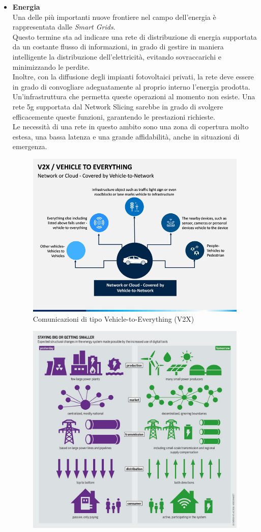 \begin{itemize}
	\item \textbf{Energia}\\
	Una delle più importanti nuove frontiere nel campo dell'energia è rappresentata dalle \textit{Smart Grids}.\\Questo termine sta ad indicare una rete di distribuzione di energia supportata da un costante flusso di informazioni, in grado di gestire in maniera intelligente la distribuzione dell'elettricità, evitando sovraccarichi e minimizzando le perdite.\\Inoltre, con la diffusione degli impianti fotovoltaici privati, la rete deve essere in grado di convogliare adeguatamente al proprio interno l'energia prodotta.\\
	Un'infrastruttura che permetta queste operazioni al momento non esiste. Una rete 5g supportata dal Network Slicing sarebbe in grado di svolgere efficacemente queste funzioni, garantendo le prestazioni richieste.\\
	Le necessità di una rete in questo ambito sono una zona di copertura molto estesa, una bassa latenza e una grande affidabilità, anche in situazioni di emergenza.
	\begin{figure}
		\centering
		\includegraphics[width=0.75\linewidth]{../immagini/vehicle-to-everything-slide12}
		\caption[Vehicle-to-everything]{Comunicazioni di tipo Vehicle-to-Everything (V2X)}
		\label{fig:vehicle-to-everything-slide12}
	\end{figure}
	\begin{figure}
		\centering
		\includegraphics[width=0.75\linewidth]{../immagini/0_7i2ht2hZquYBwybh}

\end{figure}
\end{itemize}
